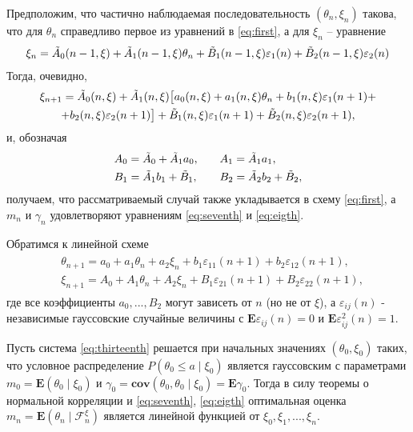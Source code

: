 \begin{corollary}
	Предположим, что частично наблюдаемая последовательность $(\theta_n, \xi_n)$ такова, что для $\theta_n$ справедливо первое из уравнений в \eqref{eq:first}, а для $\xi_n$ – уравнение
	\begin{align}
	\label{eq:twelve}
	\xi_n = \Tilde{A}_0(n - 1, \xi) + \Tilde{A}_1(n - 1, \xi) \theta_n + \Tilde{B}_1(n - 1, \xi) \varepsilon_1(n) + \Tilde{B}_2(n - 1, \xi) \varepsilon_2(n)
	\end{align}
	Тогда, очевидно,
	\begin{multline*}
	\xi_{n + 1} = \Tilde{A}_0(n, \xi) + \Tilde{A}_1(n, \xi) \big[a_0(n, \xi) + a_1(n, \xi) \theta_n + b_1 (n, \xi) \varepsilon_1 (n + 1) + \\
	+ b_2 (n, \xi) \varepsilon_2 (n + 1)\big] + \Tilde{B}_1 (n, \xi) \varepsilon_1 (n + 1) + \Tilde{B}_2 (n, \xi) \varepsilon_2 (n + 1),
	\end{multline*}
	и, обозначая
	\begin{alignat*}{2}
	& A_0 = \Tilde{A}_0 + \Tilde{A}_1 a_0, \quad &&  A_1 = \Tilde{A}_1 a_1, \\
	& B_1 = \Tilde{A}_1 b_1 + \Tilde{B}_1, \quad &&  B_2 = \Tilde{A}_2 b_2 + \Tilde{B}_2,
	\end{alignat*}
	получаем, что рассматриваемый случай также укладывается в схему \eqref{eq:first}, а $m_n$ и $\gamma_n$ удовлетворяют уравнениям \eqref{eq:seventh} и \eqref{eq:eigth}.
\end{corollary}


Обратимся к линейной схеме
\begin{align}
\label{eq:thirteenth}
\begin{split}
& \theta_{n + 1} = a_0 + a_1 \theta_n + a_2 \xi_n + b_1 \varepsilon_{11}(n + 1) + b_2 \varepsilon_{12}(n + 1), \\
& \xi_{n + 1} = A_0 + A_1 \theta_n + A_2 \xi_n + B_1 \varepsilon_{21}(n + 1) + B_2 \varepsilon_{22}(n + 1),
\end{split}
\end{align}
где все коэффициенты $a_0, ..., B_2$ могут зависеть от $n$ (но не от $\xi$), а $\varepsilon_{ij}(n)$ - независимые гауссовские случайные величины с $\mathbf{E}\varepsilon_{ij}(n) = 0$ и $\mathbf{E}\varepsilon^2_{ij}(n) = 1$.

Пусть система \eqref{eq:thirteenth} решается при начальных значениях $(\theta_0, \xi_0)$ таких, что условное распределение $P(\theta_0 \leqslant a \mid \xi_0)$ является гауссовским с параметрами $m_0 = \mathbf{E}(\theta_0 \mid \xi_0)$ и $\gamma_0 = \mathbf{cov}(\theta_0, \theta_0 \mid \xi_0) = \mathbf{E}\gamma_0$. Тогда в силу теоремы о нормальной корреляции и \eqref{eq:seventh}, \eqref{eq:eigth} оптимальная оценка $m_n = \mathbf{E} (\theta_n \mid \mathscr{F}^\xi_n )$ является линейной функцией от $\xi_0, \xi_1, ..., \xi_n$.

